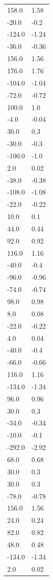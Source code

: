 \begin{longtable}{ll}
158.0 & 1.58 \\
-20.0 & -0.2 \\
-124.0 & -1.24 \\
-36.0 & -0.36 \\
156.0 & 1.56 \\
176.0 & 1.76 \\
-104.0 & -1.04 \\
-72.0 & -0.72 \\
100.0 & 1.0 \\
-4.0 & -0.04 \\
30.0 & 0.3 \\
-30.0 & -0.3 \\
-100.0 & -1.0 \\
2.0 & 0.02 \\
-38.0 & -0.38 \\
-108.0 & -1.08 \\
-22.0 & -0.22 \\
10.0 & 0.1 \\
44.0 & 0.44 \\
92.0 & 0.92 \\
116.0 & 1.16 \\
-40.0 & -0.4 \\
-96.0 & -0.96 \\
-74.0 & -0.74 \\
98.0 & 0.98 \\
8.0 & 0.08 \\
-22.0 & -0.22 \\
4.0 & 0.04 \\
-40.0 & -0.4 \\
-66.0 & -0.66 \\
116.0 & 1.16 \\
-134.0 & -1.34 \\
96.0 & 0.96 \\
30.0 & 0.3 \\
-34.0 & -0.34 \\
-10.0 & -0.1 \\
-292.0 & -2.92 \\
68.0 & 0.68 \\
30.0 & 0.3 \\
30.0 & 0.3 \\
-78.0 & -0.78 \\
156.0 & 1.56 \\
24.0 & 0.24 \\
82.0 & 0.82 \\
48.0 & 0.48 \\
-134.0 & -1.34 \\
2.0 & 0.02 \\

\end{longtable}
